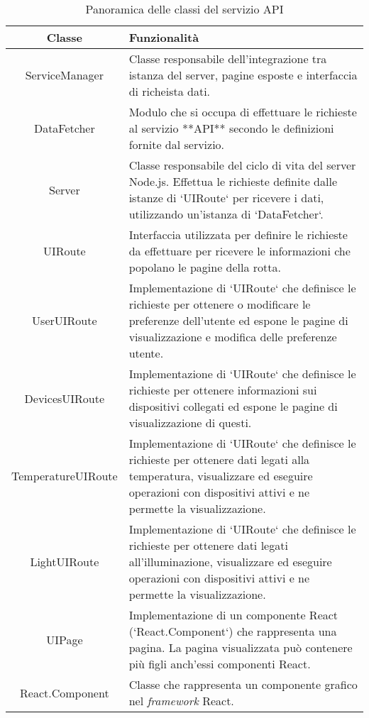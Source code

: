 \begin{table}[!h]
\caption{Panoramica delle classi del servizio API}
\label{tab:classi-web}
\begin{tabularx}{\linewidth}{|c|X|}
\hline
\textbf{Classe} & \textbf{Funzionalità} \\
\hline
ServiceManager & Classe responsabile dell'integrazione tra istanza del server, pagine esposte e interfaccia di richeista dati. \\
\hline
DataFetcher & Modulo che si occupa di effettuare le richieste al servizio **API** secondo le definizioni fornite dal servizio. \\
\hline
Server & Classe responsabile del ciclo di vita del server Node.js. Effettua le richieste definite dalle istanze di `UIRoute` per ricevere i dati, utilizzando un'istanza di `DataFetcher`. \\
\hline
UIRoute & Interfaccia utilizzata per definire le richieste da effettuare per ricevere le informazioni che popolano le pagine della rotta. \\
\hline
UserUIRoute & Implementazione di `UIRoute` che definisce le richieste per ottenere o modificare le preferenze dell'utente ed espone le pagine di visualizzazione e modifica delle preferenze utente. \\
\hline
DevicesUIRoute & Implementazione di `UIRoute` che definisce le richieste per ottenere informazioni sui dispositivi collegati ed espone le pagine di visualizzazione di questi. \\
\hline
TemperatureUIRoute & Implementazione di `UIRoute` che definisce le richieste per ottenere dati legati alla temperatura, visualizzare ed eseguire operazioni con dispositivi attivi e ne permette la visualizzazione. \\
\hline
LightUIRoute & Implementazione di `UIRoute` che definisce le richieste per ottenere dati legati all'illuminazione, visualizzare ed eseguire operazioni con dispositivi attivi e ne permette la visualizzazione. \\
\hline
UIPage & Implementazione di un componente React (`React.Component`) che rappresenta una pagina. La pagina visualizzata può contenere più figli anch'essi componenti React. \\
\hline
React.Component & Classe che rappresenta un componente grafico nel \emph{framework} React. \\
\hline
\end{tabularx}
\end{table}

\pagebreak

